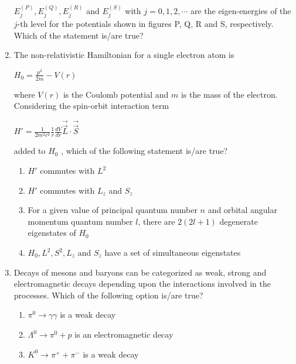\documentclass[journal]{IEEEtran}
\begin{document}
\begin{enumerate}
$E_j^{(P)},E_j^{(Q)},E_j^{(R)}$ and $E_j^{(S)}$ with $j=0,1,2,\cdots$ are the eigen-energies of the $j$-th level
for the potentials shown in figures P, Q, R and S, respectively. Which of the statement is/are true? 
\begin{enumerate}
\end{enumerate}
\item The non-relativistic Hamiltonian for a single electron atom is 
\begin{center}
    {$H_0=\frac{p^2}{2m}-V(r)$ \\}
\end{center}
where $V(r)$ is the Coulomb potential and $m$ is the mass of the electron. Considering
the spin-orbit interaction term
\begin{center}
     {$H'=\frac{1}{2m^2c^2}\frac{1}{r}\frac{dV}{dr}\Vec{\overrightarrow{L}}\cdot\Vec{\overrightarrow{S}} $ \\ }
\end{center}
  added to $H_0$ , which of the following statement is/are true?
  \begin{enumerate}
      \item $H'$ commutes with $L^2$
      \item $H'$ commutes with $L_z$ and $S_z$
      \item For a given value of principal quantum number $n$ and orbital angular momentum
quantum number $l$, there are $2(2l+1)$ degenerate eigenstates of $H_0$
\item $H_0,L^2,S^2,L_z$ and $S_z$ have a set of simultaneous eigenstates 
 \end{enumerate}
 \item Decays of mesons and baryons can be categorized as weak, strong and
electromagnetic decays depending upon the interactions involved in the processes.
Which of the following option is/are true?
\begin{enumerate}
    \item $\pi^0\rightarrow\gamma\gamma   $      is a weak decay
    \item $\Lambda^0\rightarrow\pi^0+p$     is an electromagnetic decay
    \item $K^0\rightarrow\pi^++\pi^-$  is a weak decay

\end{enumerate}
\end{enumerate}
\end{document}
